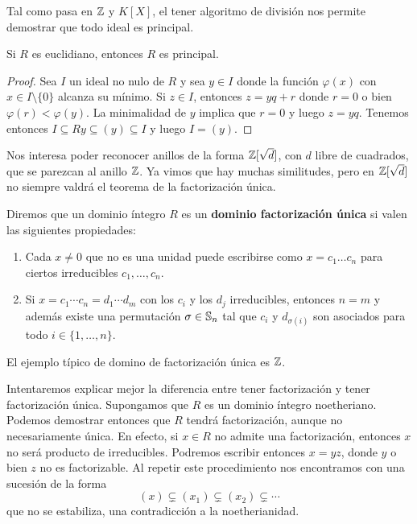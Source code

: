 Tal como pasa en $\mathbb{Z}$ y $K[X]$, el tener algoritmo de división nos permite demostrar que todo ideal es principal.

\begin{theorem}
	Si $R$ es euclidiano, entonces $R$ es principal. 
\end{theorem}

\begin{proof}
	Sea $I$ un ideal no nulo de $R$ y sea $y\in I$ donde la función $\varphi(x)$ con $x\in I\setminus\{0\}$ alcanza su mínimo. 
	Si $z\in I$, entonces $z=yq+r$ donde $r=0$ o bien $\varphi(r)<\varphi(y)$. La minimalidad de $y$ implica que $r=0$ y 
	luego $z=yq$. Tenemos entonces $I\subseteq Ry\subseteq (y)\subseteq I$ y luego $I=(y)$.     
\end{proof}

Nos interesa poder reconocer anillos de la forma $\mathbb{Z}[\sqrt{d}]$, con $d$ libre de cuadrados, que se parezcan al anillo $\mathbb{Z}$. Ya vimos
que hay muchas similitudes, pero en $\mathbb{Z}[\sqrt{d}]$ no siempre valdrá el teorema de la factorización única.

\begin{definition}
Diremos que un dominio íntegro $R$ es un \textbf{dominio factorización única} si valen las siguientes propiedades:
\begin{enumerate}
\item Cada $x\ne0$ que no es una unidad puede escribirse 
como $x=c_1\dots c_n$ para ciertos irreducibles $c_1,\dots,c_n$.  
\item Si $x=c_1\cdots c_n=d_1\cdots d_m$ con los $c_i$ y los $d_j$ irreducibles, entonces $n=m$ y además existe 
una permutación $\sigma\in\mathbb{S}_n$ tal que $c_i$ y $d_{\sigma(i)}$ son asociados para todo $i\in\{1,\dots,n\}$. 	
\end{enumerate}
\end{definition}

El ejemplo típico de domino de factorización única es $\mathbb{Z}$. 

Intentaremos explicar mejor la diferencia entre tener factorización y tener factorización única. Supongamos que $R$ es un dominio íntegro noetheriano. Podemos demostrar entonces que $R$ tendrá factorización, aunque no necesariamente única. En efecto, si $x\in R$ no admite una factorización, entonces $x$ no será 
producto de irreducibles. Podremos escribir entonces $x=yz$, donde $y$ o bien $z$ no es factorizable. Al repetir este procedimiento 
nos encontramos con una sucesión de la forma
\[
(x)\subsetneq (x_1)\subsetneq (x_2)\subsetneq\cdots
\]
que no se estabiliza, una contradicción a la noetherianidad. 

